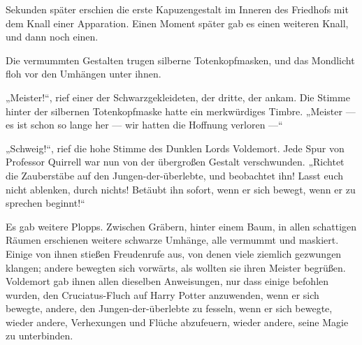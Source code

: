 Sekunden später erschien die erste Kapuzengestalt im Inneren des Friedhofs mit dem Knall einer Apparation. Einen Moment später gab es einen weiteren Knall, und dann noch einen.

Die vermummten Gestalten trugen silberne Totenkopfmasken, und das Mondlicht floh vor den Umhängen unter ihnen.

„Meister!“, rief einer der Schwarzgekleideten, der dritte, der ankam. Die Stimme hinter der silbernen Totenkopfmaske hatte ein merkwürdiges Timbre.
„Meister — es ist schon so lange her — wir hatten die Hoffnung verloren —“

„Schweig!“, rief die hohe Stimme des Dunklen Lords Voldemort.
Jede Spur von Professor Quirrell war nun von der übergroßen Gestalt verschwunden.
„Richtet die Zauberstäbe auf den Jungen-der-überlebte, und beobachtet ihn! Lasst euch nicht ablenken, durch nichts! Betäubt ihn sofort, wenn er sich bewegt, wenn er zu sprechen beginnt!“

Es gab weitere Plopps. Zwischen Gräbern, hinter einem Baum, in allen schattigen Räumen erschienen weitere schwarze Umhänge, alle vermummt und maskiert. Einige von ihnen stießen Freudenrufe aus, von denen viele ziemlich gezwungen klangen; andere bewegten sich vorwärts, als wollten sie ihren Meister begrüßen. Voldemort gab ihnen allen dieselben Anweisungen, nur dass einige befohlen wurden, den Cruciatus-Fluch auf Harry Potter anzuwenden, wenn er sich bewegte, andere, den Jungen-der-überlebte zu fesseln, wenn er sich bewegte, wieder andere, Verhexungen und Flüche abzufeuern, wieder andere, seine Magie zu unterbinden.

